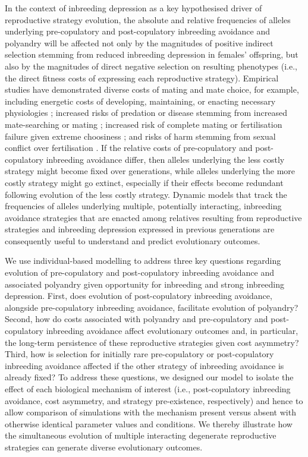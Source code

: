 \documentclass[12pt]{article}
\begin{document}
In the context of inbreeding depression as a key hypothesised driver of reproductive strategy evolution, the absolute and relative frequencies of alleles underlying pre-copulatory and post-copulatory inbreeding avoidance and polyandry will be affected not only by the magnitudes of positive indirect selection stemming from reduced inbreeding depression in females' offspring, but also by the magnitudes of direct negative selection on resulting phenotypes (i.e., the direct fitness costs of expressing each reproductive strategy). Empirical studies have demonstrated diverse costs of mating and mate choice, for example, including energetic costs of developing, maintaining, or enacting necessary physiologies \cite[e.g.,][]{Gasparini2011, Tuni2013, Fitzpatrick2014b}; increased risks of predation or disease stemming from increased mate-searching or mating \cite[e.g.,][]{Rowe1988, Ronkainen1994, Koga1998}; increased risk of complete mating or fertilisation failure given extreme choosiness \cite[][]{Kokko2013}; and risks of harm stemming from sexual conflict over fertilisation \cite[e.g.,][]{Rowe1994}. If the relative costs of pre-copulatory and post-copulatory inbreeding avoidance differ, then alleles underlying the less costly strategy might become fixed over generations, while alleles underlying the more costly strategy might go extinct, especially if their effects become redundant following evolution of the less costly strategy. Dynamic models that track the frequencies of alleles underlying multiple, potentially interacting, inbreeding avoidance strategies that are enacted among relatives resulting from reproductive strategies and inbreeding depression expressed in previous generations are consequently useful to understand and predict evolutionary outcomes.

We use individual-based modelling to address three key questions regarding evolution of pre-copulatory and post-copulatory inbreeding avoidance and associated polyandry given opportunity for inbreeding and strong inbreeding depression. First, does evolution of post-copulatory inbreeding avoidance, alongside pre-copulatory inbreeding avoidance, facilitate evolution of polyandry? Second, how do costs associated with polyandry and pre-copulatory and post-copulatory inbreeding avoidance affect evolutionary outcomes and, in particular, the long-term persistence of these reproductive strategies given cost asymmetry? Third, how is selection for initially rare pre-copulatory or post-copulatory inbreeding avoidance affected if the other strategy of inbreeding avoidance is already fixed? To address these questions, we designed our model to isolate the effect of each biological mechanism of interest (i.e., post-copulatory inbreeding avoidance, cost asymmetry, and strategy pre-existence, respectively) and hence to allow comparison of simulations with the mechanism present versus absent with otherwise identical parameter values and conditions. We thereby illustrate how the simultaneous evolution of multiple interacting degenerate reproductive strategies can generate diverse evolutionary outcomes. 
\end{document}
